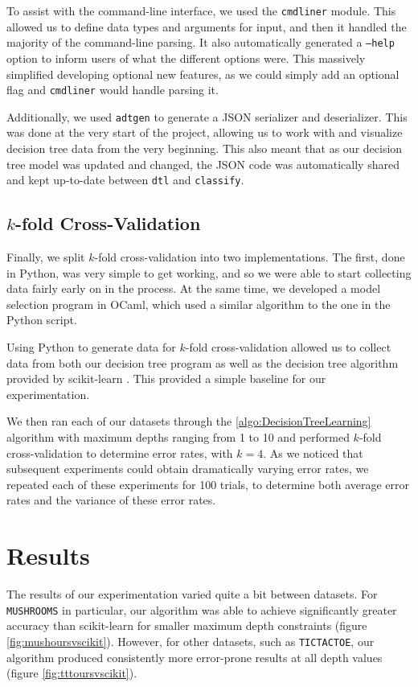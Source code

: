 \documentclass[screen, authorversion, nonacm, sigconf]{acmart}
\begin{document}
To assist with the command-line interface, we used the \texttt{cmdliner} module. This allowed us to define data types and arguments for input, and then it handled the majority of the command-line parsing. It also automatically generated a \texttt{--help} option to inform users of what the different options were. This massively simplified developing optional new features, as we could simply add an optional flag and \texttt{cmdliner} would handle parsing it.

Additionally, we used \texttt{adtgen} to generate a JSON serializer and deserializer. This was done at the very start of the project, allowing us to work with and visualize decision tree data from the very beginning. This also meant that as our decision tree model was updated and changed, the JSON code was automatically shared and kept up-to-date between \texttt{dtl} and \texttt{classify}.

\subsection{$k$-fold Cross-Validation}

Finally, we split $k$-fold cross-validation into two implementations. The first, done in Python, was very simple to get working, and so we were able to start collecting data fairly early on in the process. At the same time, we developed a model selection program in OCaml, which used a similar algorithm to the one in the Python script.

Using Python to generate data for $k$-fold cross-validation allowed us to collect data from both our decision tree program as well as the decision tree algorithm provided by scikit-learn \cite{scikit-learn}. This provided a simple baseline for our experimentation.

We then ran each of our datasets through the \ref{algo:DecisionTreeLearning} algorithm with maximum depths ranging from 1 to 10 and performed $k$-fold cross-validation to determine error rates, with $k = 4$. As we noticed that subsequent experiments could obtain dramatically varying error rates, we repeated each of these experiments for 100 trials, to determine both average error rates and the variance of these error rates.

\section{Results}

The results of our experimentation varied quite a bit between datasets. For \texttt{MUSHROOMS} in particular, our algorithm was able to achieve significantly greater accuracy than scikit-learn for smaller maximum depth constraints (figure \ref{fig:mushoursvscikit}). However, for other datasets, such as \texttt{TICTACTOE}, our algorithm produced consistently more error-prone results at all depth values (figure \ref{fig:tttoursvscikit}).
\end{document}
